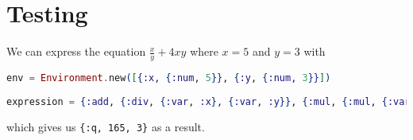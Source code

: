 \section{Testing}
We can express the equation $\frac{x}{y} + 4xy$ where $x = 5$ and $y = 3$ with
\begin{lstlisting}[language=Elixir, caption=Testing our expression module ]
env = Environment.new([{:x, {:num, 5}}, {:y, {:num, 3}}])
    
expression = {:add, {:div, {:var, :x}, {:var, :y}}, {:mul, {:mul, {:var, :x}, {:var, :y}}, {:num, 4}}}
\end{lstlisting}
which gives us \texttt{\{:q, 165, 3\}} as a result.